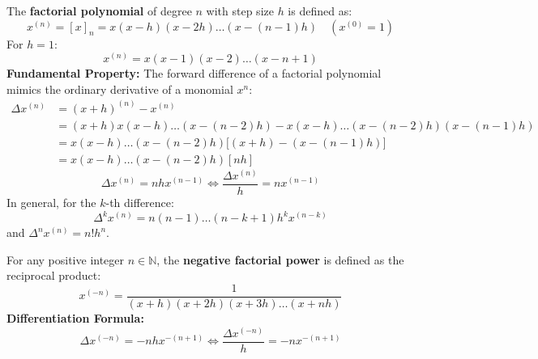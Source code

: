 \begin{theorembox}
The \textbf{factorial polynomial} of degree $n$ with step size $h$ is defined as:
\begin{equation}
    \boxed{x^{(n)} = [x]_n = x(x - h)(x - 2h)\dots(x - (n-1)h)} \quad (x^{(0)} = 1)
\end{equation}
For $h = 1$:
\begin{equation}
    x^{(n)} = x(x - 1)(x - 2)\dots(x - n + 1)
\end{equation}
\textbf{Fundamental Property:}
The forward difference of a factorial polynomial mimics the ordinary derivative of a monomial $x^n$:
\begin{align}
    \Delta x^{(n)} &= (x + h)^{(n)} - x^{(n)} \nonumber \\
    &= (x + h)x(x - h)\dots(x - (n-2)h) - x(x - h)\dots(x - (n-2)h)(x - (n-1)h) \nonumber \\
    &= x(x - h)\dots(x - (n-2)h) \big[ (x + h) - (x - (n-1)h) \big] \nonumber \\
    &= x(x - h)\dots(x - (n-2)h) [n h]
\end{align}
\begin{equation}
    \boxed{\Delta x^{(n)} = n h x^{(n-1)}} \iff \frac{\Delta x^{(n)}}{h} = n x^{(n-1)}
\end{equation}
In general, for the $k$-th difference:
\begin{equation}
    \boxed{\Delta^k x^{(n)} = n(n-1)\dots(n-k+1) h^k x^{(n-k)}}
\end{equation}
and $\Delta^n x^{(n)} = n! h^n$.
\end{theorembox}

\begin{theorembox}
For any positive integer $n \in \mathbb{N}$, the \textbf{negative factorial power} is defined as the reciprocal product:
\begin{equation}
    \boxed{x^{(-n)} = \frac{1}{(x + h)(x + 2h)(x + 3h)\dots(x + nh)}}
\end{equation}
\textbf{Differentiation Formula:}
\begin{equation}
    \boxed{\Delta x^{(-n)} = -n h x^{-(n+1)}} \iff \frac{\Delta x^{(-n)}}{h} = -n x^{-(n+1)}
\end{equation}
\end{theorembox}

